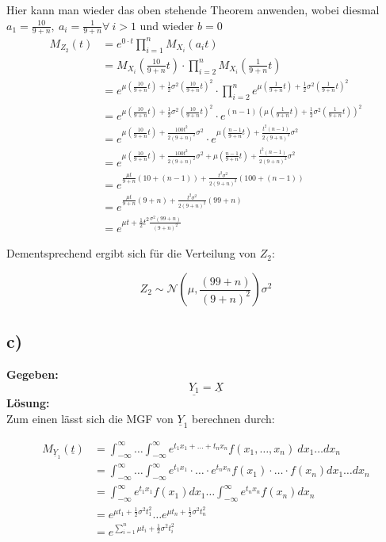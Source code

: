 \documentclass{article}
\begin{document}
Hier kann man wieder das oben stehende Theorem anwenden, wobei diesmal $a_1 = \frac{10}{9+n}, ~ a_i = \frac{1}{9 +n} \forall ~ i > 1$ und wieder $b=0$
\begin{align*}
    M_{Z_2}(t) &= e^{0 \cdot t} \prod_{i = 1}^{n} M_{X_i}(a_i t) \\
    &= M_{X_i}(\frac{10}{9+n}t)\cdot\prod_{i = 2}^{n} M_{X_i}(\frac{1}{9+n} t) \\
    &= e^{\mu (\frac{10}{9+n}t) + \frac{1}{2}\sigma^2(\frac{10}{9+n}t)^2} \cdot\prod_{i = 2}^{n} e^{\mu (\frac{1}{9+n}t) + \frac{1}{2}\sigma^2(\frac{1}{9+n}t)^2} \\ 
    &= e^{\mu (\frac{10}{9+n}t) + \frac{1}{2}\sigma^2(\frac{10}{9+n}t)^2} \cdot e^{(n-1)(\mu (\frac{1}{9+n}t) + \frac{1}{2}\sigma^2(\frac{1}{9+n}t))^2} \\
    &= e^{\mu (\frac{10}{9+n}t) + \frac{100t^2}{2(9+n)^2}\sigma^2} \cdot e^{\mu (\frac{n-1}{9+n}t) + \frac{t^2(n-1)}{2(9+n)^2}\sigma^2} \\
    &= e^{\mu (\frac{10}{9+n}t) + \frac{100t^2}{2(9+n)^2}\sigma^2 + \mu (\frac{n-1}{9+n}t) + \frac{t^2(n-1)}{2(9+n)^2}\sigma^2} \\
    &= e^{\frac{\mu t}{9 +n}(10 + (n -1)) + \frac{t^2\sigma^2}{2(9+n)^2}(100 + (n -1))} \\
    &= e^{\frac{\mu t}{9 +n}(9+n)+ \frac{t^2\sigma^2}{2(9+n)^2}(99 + n)} \\
    &= e^{\mu t +  \frac{1}{2} t^2 \frac{\sigma^2(99 + n)}{(9+n)^2}}
\end{align*}

Dementsprechend ergibt sich für die Verteilung von $Z_2$:

\[Z_2 \sim \mathcal{N}(\mu, \frac{(99 + n)}{(9+n)^2})\sigma^2\]
\subsection*{c)}
\textbf{Gegeben:}\\

\[\underline{Y_{1}} = \underline{X}\] 
\textbf{Lösung:}\\ 

Zum einen lässt sich die MGF von $\underline{Y}_{1}$ berechnen durch:

\begin{align*}
    M_{\underline{Y}_1}(\underline{t}) &=\int_{-\infty}^{\infty}\ldots\int_{-\infty}^{\infty} e^{t_1x_1 + \ldots + t_nx_n} f(x_1, \ldots, x_n) ~ dx_1 \ldots dx_n \tag*{Wegen Unabhängigkeit}\\
    &= \int_{-\infty}^{\infty}\ldots\int_{-\infty}^{\infty} e^{t_1x_1} \cdot \ldots \cdot e^{t_nx_n} f(x_1) \cdot \ldots \cdot f(x_n) dx_1 \ldots dx_n \\
    &= \int_{-\infty}^{\infty} e^{t_1x_1} f(x_1) dx_1 \ldots \int_{-\infty}^{\infty} e^{t_nx_n} f(x_n) dx_n \\
    &= e^{\mu t_1 + \frac{1}{2}\sigma^2 t_1^2} \ldots e^{\mu t_n + \frac{1}{2}\sigma^2 t_n^2} \\
    &= e^{\sum_{i = 1}^{n}\mu t_i + \frac{1}{2}\sigma^2 t_i^2}
\end{align*}
\end{document}
